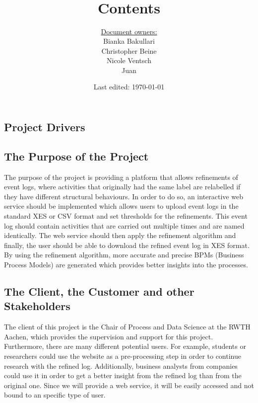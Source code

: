 \documentclass[notitlepage]{article}
\title{%
	\documentName\text{ } \\
  \large \projectName\text{ } \\
  }
\author{
	\large \underline{Document owners:}\\ 
	Bianka Bakullari\\
	\texttt{}
	Christopher Beine\\
	\texttt{}
	Nicole Ventsch\\
	\texttt{}
	Juan\\
	\texttt{}
}
\date{\small{Last edited: \today}}
\begin{document}
\begin{titlepage}
\clearpage\maketitle			%
\thispagestyle{fancy}


\end{titlepage}

\title{ \large \textbf{ Contents}}
\tableofcontents

\newpage

\rfoot{\thepage}				%


\begin{flushleft}				%

\section{Project Drivers}

\subsection{The Purpose of the Project}

The purpose of the project is providing a platform that allows refinements of event logs, where activities that originally had the same label are relabelled if they have different structural behaviours. In order to do so, an interactive web service should be implemented which allows users to upload event logs in the standard XES or CSV format and set thresholds for the refinements. This event log should contain activities that are carried out multiple times and are named identically. The web service should then apply the refinement algorithm and finally, the user should be able to download the refined event log in XES format. By using the refinement algorithm, more accurate and precise BPMs (Business Process Models) are generated which provides better insights into the processes.

\subsection{The Client, the Customer and other Stakeholders}

The client of this project is the Chair of Process and Data Science at the RWTH Aachen, which provides the supervision and support for this project. Furthermore, there are many different potential users. For example, students or researchers could use the website as a pre-processing step in order to continue research with the refined log. Additionally, business analysts from companies could use it in order to get a better insight from the refined log than from the original one. Since we will provide a web service, it will be easily accessed and not bound to an specific type of user. 


\end{flushleft}
\end{document}
